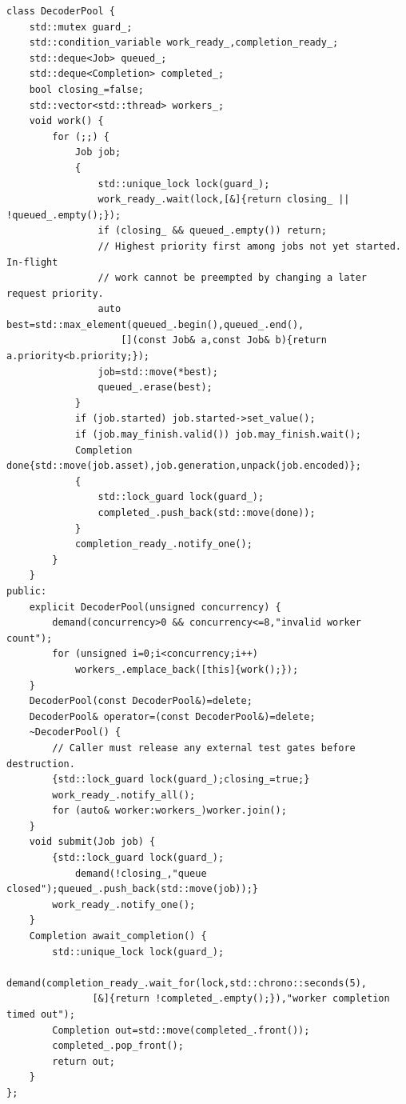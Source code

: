 \begin{verbatim}
class DecoderPool {
    std::mutex guard_;
    std::condition_variable work_ready_,completion_ready_;
    std::deque<Job> queued_;
    std::deque<Completion> completed_;
    bool closing_=false;
    std::vector<std::thread> workers_;
    void work() {
        for (;;) {
            Job job;
            {
                std::unique_lock lock(guard_);
                work_ready_.wait(lock,[&]{return closing_ || !queued_.empty();});
                if (closing_ && queued_.empty()) return;
                // Highest priority first among jobs not yet started. In-flight
                // work cannot be preempted by changing a later request priority.
                auto best=std::max_element(queued_.begin(),queued_.end(),
                    [](const Job& a,const Job& b){return a.priority<b.priority;});
                job=std::move(*best);
                queued_.erase(best);
            }
            if (job.started) job.started->set_value();
            if (job.may_finish.valid()) job.may_finish.wait();
            Completion done{std::move(job.asset),job.generation,unpack(job.encoded)};
            {
                std::lock_guard lock(guard_);
                completed_.push_back(std::move(done));
            }
            completion_ready_.notify_one();
        }
    }
public:
    explicit DecoderPool(unsigned concurrency) {
        demand(concurrency>0 && concurrency<=8,"invalid worker count");
        for (unsigned i=0;i<concurrency;i++)
            workers_.emplace_back([this]{work();});
    }
    DecoderPool(const DecoderPool&)=delete;
    DecoderPool& operator=(const DecoderPool&)=delete;
    ~DecoderPool() {
        // Caller must release any external test gates before destruction.
        {std::lock_guard lock(guard_);closing_=true;}
        work_ready_.notify_all();
        for (auto& worker:workers_)worker.join();
    }
    void submit(Job job) {
        {std::lock_guard lock(guard_);
            demand(!closing_,"queue closed");queued_.push_back(std::move(job));}
        work_ready_.notify_one();
    }
    Completion await_completion() {
        std::unique_lock lock(guard_);
        demand(completion_ready_.wait_for(lock,std::chrono::seconds(5),
               [&]{return !completed_.empty();}),"worker completion timed out");
        Completion out=std::move(completed_.front());
        completed_.pop_front();
        return out;
    }
};


\end{verbatim}

